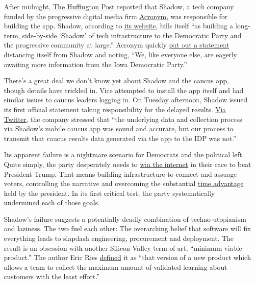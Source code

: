 After midnight,
\href{https://www.huffingtonpost.co.uk/entry/iowa-caucus-app-shadow_n_5e390191c5b687dacc722824?ri18n=true}{The
Huffington Post} reported that Shadow, a tech company funded by the
progressive digital media firm
\href{https://www.nytimes.com/2019/11/04/us/politics/democratic-political-campaign-advertising.html}{Acronym},
was responsible for building the app. Shadow, according to
\href{https://shadowinc.io/about}{its website}, bills itself ``as
building a long-term, side-by-side `Shadow' of tech infrastructure to
the Democratic Party and the progressive community at large.'' Acronym
quickly
\href{https://twitter.com/teddyschleifer/status/1224585689586532352}{put
out a statement} distancing itself from Shadow and noting, ``We, like
everyone else, are eagerly awaiting more information from the Iowa
Democratic Party.''

There's a great deal we don't know yet about Shadow and the caucus app,
though details have trickled in. Vice attempted to install the app
itself and had similar issues to caucus leaders logging in. On Tuesday
afternoon, Shadow issued its first official statement taking
responsibility for the delayed results.
\href{https://twitter.com/ShadowIncHQ/status/1224773797380837377?s=20}{Via
Twitter,} the company stressed that ``the underlying data and collection
process via Shadow's mobile caucus app was sound and accurate, but our
process to transmit that caucus results data generated via the app to
the IDP was not.''

Its apparent failure is a nightmare scenario for Democrats and the
political left. Quite simply, the party desperately needs to
\href{https://www.nytimes.com/interactive/2019/11/01/opinion/democrats-2020-election-online.html}{win
the internet} in their race to beat President Trump. That means building
infrastructure to connect and assuage voters, controlling the narrative
and overcoming the substantial
\href{https://www.nytimes.com/interactive/2019/11/01/opinion/democrats-2020-election-online.html}{time
advantage} held by the president. In its first critical test, the party
systematically undermined each of those goals.

Shadow's failure suggests a potentially deadly combination of
techno-utopianism and laziness. The two fuel each other: The overarching
belief that software will fix everything leads to slapdash engineering,
procurement and deployment. The result is an obsession with another
Silicon Valley term of art, ``minimum viable product.'' The author Eric
Ries
\href{http://www.startuplessonslearned.com/2009/08/minimum-viable-product-guide.html}{defined}
it as ``that version of a new product which allows a team to collect the
maximum amount of validated learning about customers with the least
effort.''

